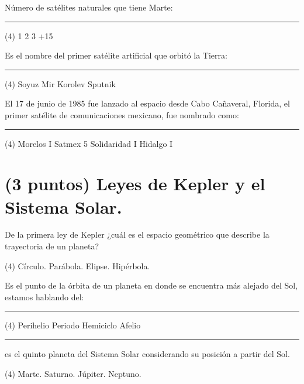 \documentclass[12pt, letter]{exam}
\begin{document}
\begin{questions}
    \question Número de satélites naturales que tiene Marte: \rule{2cm}{0.1mm}
    \begin{tasks}(4)
        \task \num{1}
        \task \num{2}
        \task \num{3}
        \task +\num{15}
    \end{tasks}
    \question Es el nombre del primer satélite artificial que orbitó la Tierra: \rule{2cm}{0.1mm}
    \begin{tasks}(4)
        \task Soyuz
        \task Mir
        \task Korolev
        \task Sputnik
    \end{tasks}
    \question El 17 de junio de 1985 fue lanzado al espacio desde Cabo Cañaveral, Florida, el primer satélite de comunicaciones mexicano, fue nombrado como: \rule{2cm}{0.1mm}
    \begin{tasks}(4)
        \task Morelos I
        \task Satmex 5
        \task Solidaridad I
        \task Hidalgo I
    \end{tasks}


    \section{(3 puntos) Leyes de Kepler y el Sistema Solar.}

    \question De la primera ley de Kepler ¿cuál es el espacio geométrico que describe la trayectoria de un planeta?
    \begin{tasks}(4)
        \task Círculo.
        \task Parábola.
        \task Elipse.
        \task Hipérbola.
    \end{tasks}
    \question Es el punto de la órbita de un planeta en donde se encuentra más alejado del Sol, estamos hablando del: \rule{2cm}{0.1mm}
    \begin{tasks}(4)
        \task Perihelio
        \task Periodo
        \task Hemiciclo
        \task Afelio
    \end{tasks}
    \question \rule{2cm}{0.1mm} es el quinto planeta del Sistema Solar considerando su posición a partir del Sol.
    \begin{tasks}(4)
        \task Marte.
        \task Saturno.
        \task Júpiter.
        \task Neptuno.
    \end{tasks}
   

\end{questions}
\end{document}
